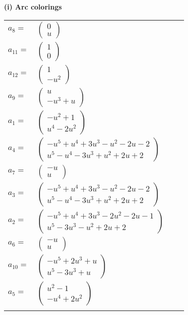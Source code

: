 \documentclass[1p]{elsarticle_modified}
\theoremstyle{definition}
\begin{document}
\flushleft \textbf{(i) Arc colorings}\\
\begin{tabular}{m{7pt} m{180pt} m{7pt} m{180pt} }
\flushright $a_{8}=$&$\begin{pmatrix}0\\u\end{pmatrix}$ \\
\flushright $a_{11}=$&$\begin{pmatrix}1\\0\end{pmatrix}$ \\
\flushright $a_{12}=$&$\begin{pmatrix}1\\- u^2\end{pmatrix}$ \\
\flushright $a_{9}=$&$\begin{pmatrix}u\\- u^3+u\end{pmatrix}$ \\
\flushright $a_{1}=$&$\begin{pmatrix}- u^2+1\\u^4-2 u^2\end{pmatrix}$ \\
\flushright $a_{4}=$&$\begin{pmatrix}- u^5+u^4+3 u^3- u^2-2 u-2\\u^5- u^4-3 u^3+u^2+2 u+2\end{pmatrix}$ \\
\flushright $a_{7}=$&$\begin{pmatrix}- u\\u\end{pmatrix}$ \\
\flushright $a_{3}=$&$\begin{pmatrix}- u^5+u^4+3 u^3- u^2-2 u-2\\u^5- u^4-3 u^3+u^2+2 u+2\end{pmatrix}$ \\
\flushright $a_{2}=$&$\begin{pmatrix}- u^5+u^4+3 u^3-2 u^2-2 u-1\\u^5-3 u^3- u^2+2 u+2\end{pmatrix}$ \\
\flushright $a_{6}=$&$\begin{pmatrix}- u\\u\end{pmatrix}$ \\
\flushright $a_{10}=$&$\begin{pmatrix}- u^5+2 u^3+u\\u^5-3 u^3+u\end{pmatrix}$ \\
\flushright $a_{5}=$&$\begin{pmatrix}u^2-1\\- u^4+2 u^2\end{pmatrix}$\\&\end{tabular}
\end{document}
